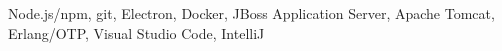 \cvitem{\ToolsTitle}
{
  Node.js/npm, git, Electron, Docker,
  JBoss Application Server, Apache Tomcat, Erlang/OTP,
  Visual Studio Code, IntelliJ
}
